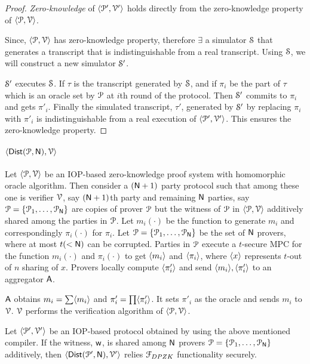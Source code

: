\begin{proof}
	\textit{Zero-knowledge} of $\langle \mathcal{P}', \mathcal{V}' \rangle$ holds directly from the zero-knowledge property of $\langle \mathcal{P}, \mathcal{V} \rangle$. 
	
	Since, $\langle \mathcal{P}, \mathcal{V} \rangle$ has zero-knowledge property, therefore $\exists$ a simulator $\mathcal{S}$ that generates a transcript that is indistinguishable from a real transcript. Using $\mathcal{S}$, we will construct a new simulator $\mathcal{S}'$. 
	
	$\mathcal{S}'$ executes $\mathcal{S}$. If $\tau$ is the transcript generated by $\mathcal{S}$, and if $\pi_i$ be the part of $\tau$ which is an oracle set by $\mathcal{P}$ at $i$th round of the protocol. Then $\mathcal{S}'$ commits to $\pi_i$ and gets $\pi'_i$. Finally the simulated transcript, $\tau'$, generated by $\mathcal{S}'$ by replacing $\pi_i$ with $\pi'_i$ is indistinguishable from a real execution of $\langle \mathcal{P}', \mathcal{V}' \rangle$. This ensures the zero-knowledge property.
\end{proof}

\paragraph*{$\langle \mathsf{Dist}(\mathcal{P}, \mathsf{N}),\mathcal{V}\rangle$} Let $\langle \mathcal{P}, \mathcal{V} \rangle$ be an IOP-based zero-knowledge proof system with homomorphic oracle algorithm. Then consider a $(\mathsf{N} + 1)$ party protocol such that among these one is verifier $\mathcal{V}$, say $(\mathsf{N} + 1)$th party and remaining $\mathsf{N}$ parties, say $\mathcal{P} = \{ \mathcal{P}_1, \ldots, \mathcal{P}_{\mathsf{N}}\}$ are copies of prover $\mathcal{P}$ but the witness of $\mathcal{P}$ in $\langle \mathcal{P}, \mathcal{V} \rangle$ additively shared among the parties in $\mathcal{P}$. 
Let $m_i(\cdot)$ be the function to generate $m_i$ and correspondingly $\pi_i(\cdot)$ for $\pi_i$. Let $\mathcal{P} = \{\mathcal{P}_{1}, \ldots, \mathcal{P}_{\mathsf{N}}\}$ be the set of $\mathsf{N}$ provers, where at most $t (<\mathsf{N})$ can be corrupted. Parties in $\mathcal{P}$ execute a $t$-secure MPC for the function $m_i(\cdot)$ and $\pi_i(\cdot)$ to get $\langle m_i \rangle$ and $\langle \pi_i \rangle$, where $\langle x \rangle$ represents $t$-out of $n$ sharing of $x$. Provers locally compute $\langle \pi'_i \rangle$ and send $\langle m_i \rangle, \langle \pi'_i \rangle$ to an aggregator $\mathsf{A}$.

$\mathsf{A}$ obtains $m_i = \sum \langle m_i \rangle$ and $\pi'_i = \prod \langle \pi'_i \rangle$. It sets $\pi'_i$ as the oracle and sends $m_i$ to $\mathcal{V}$. $\mathcal{V}$ performs the verification algorithm of $\langle \mathcal{P}, \mathcal{V} \rangle$.

\begin{lemma}\label{lemma:generic_dpzk}
	Let $\langle \mathcal{P}', \mathcal{V}' \rangle$ be an IOP-based protocol obtained by using the above mentioned compiler. If the witness, $\mathsf{w}$, is shared among $\mathsf{N}$ provers $\mathcal{P} = \{\mathcal{P}_1, \ldots, \mathcal{P}_{\mathsf{N}}\}$ additively, then $\langle \mathsf{Dist}(\mathcal{P}', \mathsf{N}), \mathcal{V}' \rangle$ relies $\mathcal{F}_{DPZK}$ functionality securely.
\end{lemma}
	
